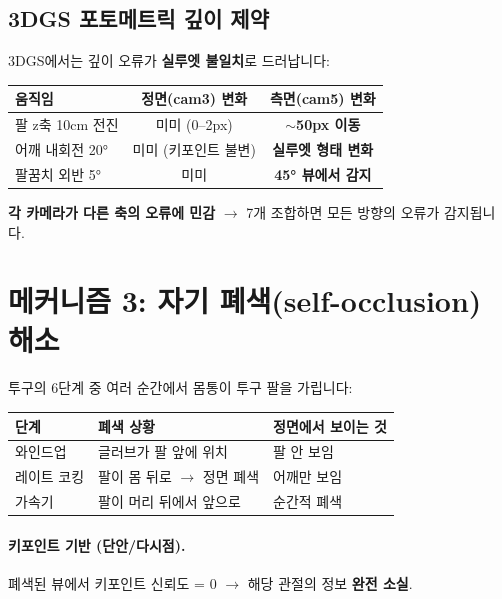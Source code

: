 \documentclass[11pt, a4paper]{report}
\begin{document}
\subsection{3DGS 포토메트릭 깊이 제약}

3DGS에서는 깊이 오류가 \textbf{실루엣 불일치}로 드러납니다:

\begin{center}
\renewcommand{\arraystretch}{1.3}
\begin{tabular}{lcc}
\toprule
\textbf{움직임} & \textbf{정면(cam3) 변화} & \textbf{측면(cam5) 변화} \\
\midrule
팔 z축 10cm 전진 & 미미 (0--2px) & \textbf{$\sim$50px 이동} \\
어깨 내회전 20° & 미미 (키포인트 불변) & \textbf{실루엣 형태 변화} \\
팔꿈치 외반 5° & 미미 & \textbf{45° 뷰에서 감지} \\
\bottomrule
\end{tabular}
\end{center}

\textbf{각 카메라가 다른 축의 오류에 민감} $\to$ 7개 조합하면 모든 방향의 오류가 감지됩니다.


\section{메커니즘 3: 자기 폐색(self-occlusion) 해소}

투구의 6단계 중 여러 순간에서 몸통이 투구 팔을 가립니다:

\begin{center}
\renewcommand{\arraystretch}{1.3}
\begin{tabular}{lll}
\toprule
\textbf{단계} & \textbf{폐색 상황} & \textbf{정면에서 보이는 것} \\
\midrule
와인드업 & 글러브가 팔 앞에 위치 & 팔 안 보임 \\
레이트 코킹 & 팔이 몸 뒤로 $\to$ 정면 폐색 & 어깨만 보임 \\
가속기 & 팔이 머리 뒤에서 앞으로 & 순간적 폐색 \\
\bottomrule
\end{tabular}
\end{center}

\paragraph{키포인트 기반 (단안/다시점).}
폐색된 뷰에서 키포인트 신뢰도 = 0 $\to$ 해당 관절의 정보 \textbf{완전 소실}.
\end{document}
